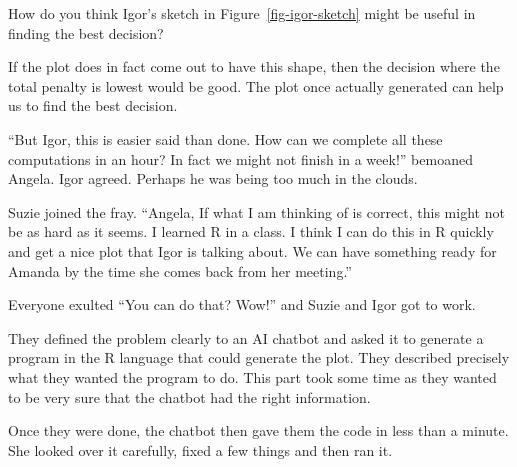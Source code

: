 \documentclass[
  12pt,
  letterpaper,
  DIV=11,
  numbers=noendperiod]{scrreprt}
\begin{document}
\begin{tcolorbox}[enhanced jigsaw, colback=white, leftrule=.75mm, toprule=.15mm, bottomtitle=1mm, breakable, coltitle=black, toptitle=1mm, title={Quick Check}, opacitybacktitle=0.6, colbacktitle=quarto-callout-note-color!10!white, arc=.35mm, left=2mm, colframe=quarto-callout-note-color-frame, titlerule=0mm, rightrule=.15mm, bottomrule=.15mm, opacityback=0]

How do you think Igor's sketch in Figure~\ref{fig-igor-sketch} might be
useful in finding the best decision?

\end{tcolorbox}

\begin{tcolorbox}[enhanced jigsaw, colback=white, leftrule=.75mm, toprule=.15mm, bottomtitle=1mm, breakable, coltitle=black, toptitle=1mm, title={Suggested answer}, opacitybacktitle=0.6, colbacktitle=quarto-callout-note-color!10!white, arc=.35mm, left=2mm, colframe=quarto-callout-note-color-frame, titlerule=0mm, rightrule=.15mm, bottomrule=.15mm, opacityback=0]

If the plot does in fact come out to have this shape, then the decision
where the total penalty is lowest would be good. The plot once actually
generated can help us to find the best decision.

\end{tcolorbox}

``But Igor, this is easier said than done. How can we complete all these
computations in an hour? In fact we might not finish in a week!''
bemoaned Angela. Igor agreed. Perhaps he was being too much in the
clouds.

Suzie joined the fray. ``Angela, If what I am thinking of is correct,
this might not be as hard as it seems. I learned R in a class. I think I
can do this in R quickly and get a nice plot that Igor is talking about.
We can have something ready for Amanda by the time she comes back from
her meeting.''

Everyone exulted ``You can do that? Wow!'' and Suzie and Igor got to
work.

They defined the problem clearly to an AI chatbot and asked it to
generate a program in the R language that could generate the plot. They
described precisely what they wanted the program to do. This part took
some time as they wanted to be very sure that the chatbot had the right
information.

Once they were done, the chatbot then gave them the code in less than a
minute. She looked over it carefully, fixed a few things and then ran
it.
\end{document}
